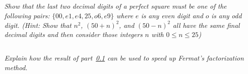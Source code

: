 \documentclass[12pt]{article}
\begin{document}
    \subsection{}\label{5a} \textit{Show that the last two decimal digits of a perfect square must be one of the following pairs: $\{00, e1, e4, 25, o6, e9\}$ where $e$ is any even digit and $o$ is any odd digit. (Hint: Show that $n^2$, ${(50 + n)}^2$, and ${(50 - n)}^2$ all have the same final decimal digits and then consider those integers $n$ with $0 \leq n \leq 25$)}

    \subsection{} \textit{Explain how the result of part~\ref{5a} can be used to speed up Fermat's factorization method.}
\end{document}
